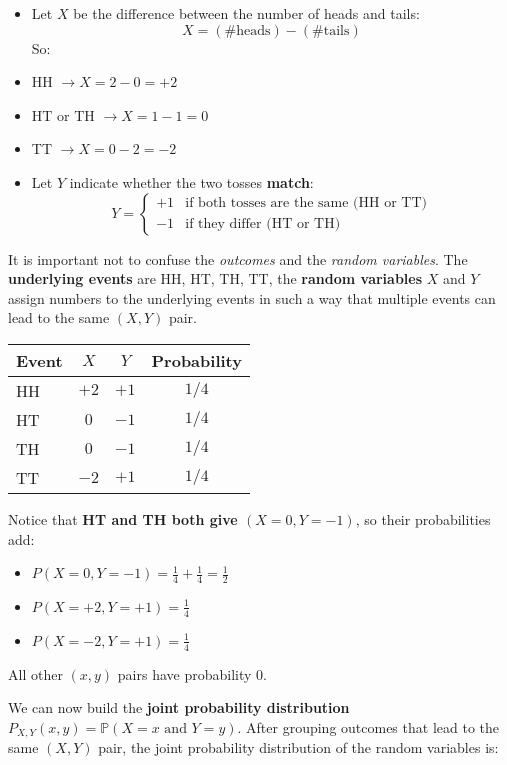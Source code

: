\documentclass[11pt]{article}
\begin{document}
\begin{itemize}
    \item Let \textbf{$X$} be the difference between the number of heads and tails:
    \[
    X = (\#\text{heads}) - (\#\text{tails})
    \]
    So:
        \item HH $\to X = 2 - 0 = +2$
        \item HT or TH $\to X = 1 - 1 = 0$
        \item TT $\to X = 0 - 2 = -2$

    \item Let \textbf{$Y$} indicate whether the two tosses \textbf{match}:
    \[
    Y = 
    \begin{cases}
    +1 & \text{if both tosses are the same (HH or TT)} \\
    -1 & \text{if they differ (HT or TH)}
    \end{cases}
    \]
\end{itemize}

It is important not to confuse the \emph{outcomes} and the \emph{random variables}. The \textbf{underlying events} are HH, HT, TH, TT, the \textbf{random variables} $X$ and $Y$ assign numbers to the underlying events in such a way that multiple events can lead to the same $(X,Y)$ pair.

\begin{center}
\begin{tabular}{lccc}
\toprule
Event & $X$ & $Y$ & Probability \\
\midrule
HH    & $+2$   & $+1$   & $1/4$     \\
HT    & $0$    & $-1$   & $1/4$     \\
TH    & $0$    & $-1$   & $1/4$     \\
TT    & $-2$   & $+1$   & $1/4$     \\
\bottomrule
\end{tabular}
\end{center}

Notice that \textbf{HT and TH both give $(X=0, Y=-1)$}, so their probabilities add:
 \begin{itemize}
    \item $P(X = 0, Y = -1) = \frac{1}{4} + \frac{1}{4} = \frac{1}{2}$
    \item $P(X = +2, Y = +1) = \frac{1}{4}$
    \item $P(X = -2, Y = +1) = \frac{1}{4}$
\end{itemize}
All other $(x,y)$ pairs have probability 0.


We can now build the \textbf{joint probability distribution} $P_{X,Y}(x, y) = \mathbb{P}(X = x \text{ and } Y = y)$. After grouping outcomes that lead to the same 
$(X,Y)$ pair, the joint probability distribution of the random variables is:
\end{document}
